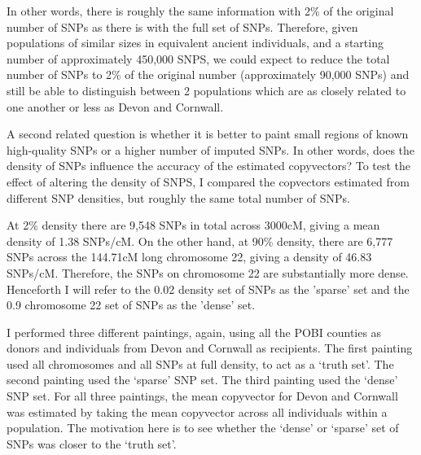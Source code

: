 In other words, there is roughly the same information with 2\% of the original number of SNPs as there is with the full set of SNPs. Therefore, given populations of similar sizes in equivalent ancient individuals, and a starting number of approximately 450,000 SNPS, we could expect to reduce the total number of SNPs to 2\% of the original number (approximately 90,000 SNPs) and still be able to distinguish between 2 populations which are as closely related to one another or less as Devon and Cornwall. 

A second related question is whether it is better to paint small regions of known high-quality SNPs or a higher number of imputed SNPs. In other words, does the density of SNPs influence the accuracy of the estimated copyvectors? To test the effect of altering the density of SNPS, I compared the copvectors estimated from different SNP densities, but roughly the same total number of SNPs. 

At 2\% density there are 9,548 SNPs in total across 3000cM, giving a mean density of 1.38 SNPs/cM. On the other hand, at 90\% density, there are 6,777 SNPs across the 144.71cM long chromosome 22, giving a density of 46.83 SNPs/cM. Therefore, the SNPs on chromosome 22 are substantially more dense. Henceforth I will refer to the 0.02 density set of SNPs as the 'sparse' set and the 0.9 chromosome 22 set of SNPs as the 'dense' set. 

I performed three different paintings, again, using all the POBI counties as donors and individuals from Devon and Cornwall as recipients. The first painting used all chromosomes and all SNPs at full density, to act as a `truth set'. The second painting used the `sparse' SNP set. The third painting used the `dense' SNP set. For all three paintings, the mean copyvector for Devon and Cornwall was estimated by taking the mean copyvector across all individuals within a population. The motivation here is to see whether the `dense' or `sparse' set of SNPs was closer to the `truth set'.  

